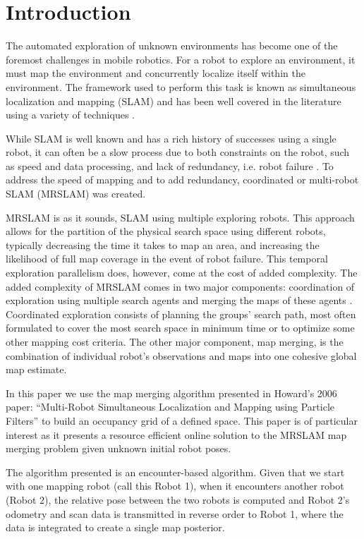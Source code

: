\section{Introduction}
\label{S:Intro}


The automated exploration of unknown environments has become one of the foremost challenges in mobile robotics. For a robot to explore an environment, it must map the environment and concurrently localize itself within the environment.  The framework used to perform this task is known as simultaneous localization and mapping (SLAM) and has been well covered in the literature using a variety of techniques \cite{durrant2006simultaneous,bailey2006simultaneous}.

While SLAM is well known and has a rich history of successes using a single robot, it can often be a slow process due to both constraints on the robot, such as speed and data processing, and lack of redundancy, i.e. robot failure \cite{thrun2001probabilistic,burgard2005coordinated}.  To address the speed of mapping and to add redundancy, coordinated or multi-robot SLAM (MRSLAM) was created.

MRSLAM is as it sounds, SLAM using multiple exploring robots. This approach allows for the partition of the physical search space using different robots, typically decreasing the time it takes to map an area, and increasing the likelihood of full map coverage in the event of robot failure. This temporal exploration parallelism does, however, come at the cost of added complexity. The added complexity of MRSLAM comes in two major components: coordination of exploration using multiple search agents and merging the maps of these agents \cite{fox2006distributed}.  Coordinated exploration consists of planning the groups' search path, most often formulated to cover the most search space in minimum time or to optimize some other mapping cost criteria. The other major component, map merging, is the combination of individual robot's observations and maps into one cohesive global map estimate.

In this paper we use the map merging algorithm presented in Howard's 2006 paper: ``Multi-Robot Simultaneous Localization and Mapping using Particle Filters'' \cite{howard2006multi} to build an occupancy grid of a defined space. This paper is of particular interest as it presents a resource efficient online solution to the MRSLAM map merging problem given unknown initial robot poses.  

The algorithm presented is an encounter-based algorithm.  Given that we start with one mapping robot (call this Robot 1), when it encounters another robot (Robot 2), the relative pose between the two robots is computed and Robot 2's odometry and scan data is transmitted in reverse order to Robot 1, where the data is integrated to create a single map posterior.

